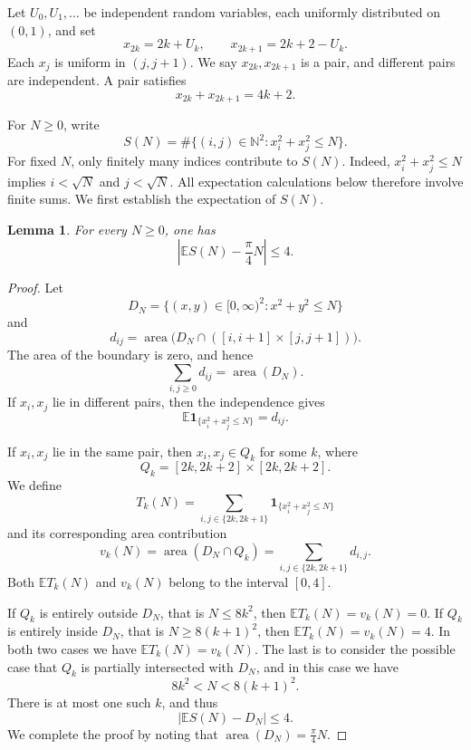 \documentclass[12pt,reqno]{amsart}
\theoremstyle{plain}
\newtheorem{lemma}{Lemma}[section]
\theoremstyle{definition}
\newcommand{\N}{\mathbb N}
\newcommand{\E}{\mathbb E}
\newcommand{\ind}{\mathbf 1}
\DeclareMathOperator{\area}{area}
\begin{document}
Let $U_0,U_1,\ldots$ be independent random variables, each uniformly
distributed on $(0,1)$, and set
\begin{equation*}
 x_{2k}=2k+U_k,\qquad x_{2k+1}=2k+2-U_k.
\end{equation*}
Each $x_j$ is uniform in $(j,j+1)$. We say $x_{2k},x_{2k+1}$ is a pair, and different pairs are independent. A pair satisfies
$$x_{2k}+x_{2k+1}=4k+2.$$


For $N\ge0$, write
\begin{equation}\label{eq:SN}
 S(N)=\#\{(i,j)\in\N^2:x_i^2+x_j^2\le N\}.
\end{equation}
For fixed $N$, only finitely many indices contribute to $S(N)$.
Indeed, $x_i^2+x_j^2\le N$ implies $i<\sqrt N$ and $j<\sqrt N$. 
All expectation calculations below therefore involve finite sums.
We first establish the expectation of $S(N)$.
\begin{lemma}\label{lem:mean}
For every $N\ge0$, one has
\begin{equation}\label{eq:mean}
 \left|\E S(N)-\frac{\pi}{4}N\right|\le4.
\end{equation}
\end{lemma}

\begin{proof}
Let
\[
 D_N=\{(x,y)\in[0,\infty)^2:x^2+y^2\le N\}
\]
and
\[
 d_{ij}=\area\bigl(D_N\cap([i,i+1]\times[j,j+1])\bigr).
\]
The area of the boundary is
zero, and hence
\begin{equation*}
 \sum_{i,j\ge0}d_{ij}=\area(D_N).
\end{equation*}
If $x_i,x_j$ lie in different pairs, then the independence gives
\begin{equation*}
 \E\ind_{\{x_i^2+x_j^2\le N\}}=d_{ij}.
\end{equation*}

If $x_i,x_j$ lie in the same pair, then $x_i,x_j\in Q_k$ for some $k$, where
\[
 Q_k=[2k,2k+2]\times[2k,2k+2].
\]
We define
\begin{equation}\label{eq:defineTk}
 T_k(N)=\sum_{i,j\in\{2k,2k+1\}}
       \ind_{\{x_i^2+x_j^2\le N\}}
       \end{equation}
       and its corresponding area contribution
\[
 v_k(N)=\area(D_N\cap Q_k)=\sum_{i,j\in\{2k,2k+1\}}d_{i,j}.
\]
Both $\E T_k(N)$ and $v_k(N)$ belong to the interval $[0,4]$.

If $Q_k$ is entirely outside $D_N$, that is $N\le8k^2$, then $\E T_k(N)=v_k(N)=0$. If $Q_k$ is entirely inside $D_N$, that is $N\ge8(k+1)^2$, then $\E T_k(N)=v_k(N)=4$.
In both two cases we have $\E T_k(N)=v_k(N)$. The last is to consider the possible case that $Q_k$ is partially intersected with $D_N$, and in this case we have
\begin{equation*}
 8k^2<N<8(k+1)^2.
\end{equation*}
There is at most one such $k$, and thus
\begin{equation*}
 \left|\E S(N)-D_N\right|\le 4.
\end{equation*}
We complete the proof by noting that $\area(D_N)=\frac{\pi}{4}N$.
\end{proof}
\end{document}
